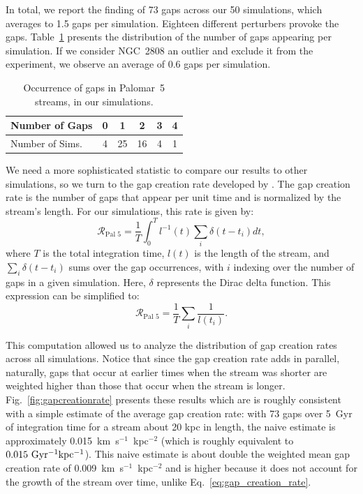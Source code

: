 \documentclass{aa}
\begin{document}
    In total, we report the finding of 73 gaps across our 50 simulations, which averages to 1.5 gaps per simulation. Eighteen different perturbers provoke the gaps. Table~\ref{table:gap_distribution} presents the distribution of the number of gaps appearing per simulation. If we consider NGC~2808 an outlier and exclude it from the experiment, we observe an average of 0.6 gaps per simulation.  
    
    \begin{table}[h]
      \centering
      \caption{Occurrence of gaps in Palomar~5 streams, in our simulations.}\label{table:gap_distribution}
        \begin{tabular}{|l|c|c|c|c|c|}
          \hline
          Number of Gaps & 0 & 1 & 2 & 3 & 4 \\
          \hline
          Number of Sims. & 4 & 25 & 16 & 4 & 1 \\
          \hline
        \end{tabular}
        \vspace{0.5cm}
    \end{table}

    We need a more sophisticated statistic to compare our results to other simulations, so we turn to the gap creation rate developed by \citet{2012ApJ...748...20C}. The gap creation rate is the number of gaps that appear per unit time and is normalized by the stream's length. For our simulations, this rate is given by: \begin{equation} \label{eq:gap_creation_rate} \mathcal{R}_{\textrm{Pal 5}} =  \frac{1}{T}\int_{0}^T l^{-1}(t) \sum_i \delta(t-t_i) dt,\end{equation}where $T$ is the total integration time, $l(t)$ is the length of the stream, and $\sum_i \delta(t-t_i)$ sums over the gap occurrences, with $i$ indexing over the number of gaps in a given simulation. Here, $\delta$ represents the Dirac delta function. This expression can be simplified to:\begin{equation}\mathcal{R}_{\textrm{Pal 5}} =  \frac{1}{T} \sum_i \frac{1}{l (t_i)}. \end{equation}
    
    This computation allowed us to analyze the distribution of gap creation rates across all simulations. Notice that since the gap creation rate adds in parallel, naturally, gaps that occur at earlier times when the stream was shorter are weighted higher than those that occur when the stream is longer. Fig.~\ref{fig:gapcreationrate} presents these results which are is roughly consistent with a simple estimate of the average gap creation rate: with 73 gaps over 5~Gyr of integration time for a stream about 20 kpc in length, the naive estimate is approximately 0.015~km~s$^{-1}$~kpc$^{-2} $ (which is roughly equivalent to $0.015~\rm{Gyr^{-1}kpc^{-1}}$). This naive estimate is about double the weighted mean gap creation rate of 0.009~km~s$^{-1}$~kpc$^{-2}$ and is higher because it does not account for the growth of the stream over time, unlike Eq.~\ref{eq:gap_creation_rate}.
\end{document}
